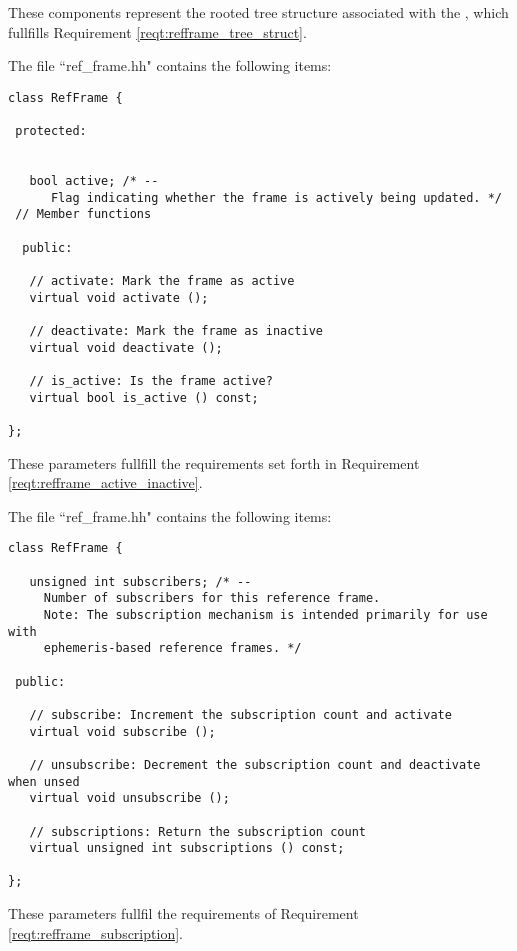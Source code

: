 These components represent the rooted tree structure associated with the
, which fullfills Requirement \ref{reqt:refframe_tree_struct}.

\label{inspect:refframe_active_inactive}

The file ``ref\_frame.hh" contains the following items:

\begin{verbatim}
class RefFrame {

 protected:


   bool active; /* --
      Flag indicating whether the frame is actively being updated. */
 // Member functions

  public:

   // activate: Mark the frame as active
   virtual void activate ();

   // deactivate: Mark the frame as inactive
   virtual void deactivate ();

   // is_active: Is the frame active?
   virtual bool is_active () const;

};
\end{verbatim}

These parameters fullfill the requirements set forth in Requirement
\ref{reqt:refframe_active_inactive}.

\label{inspect:refframe_subscribe}

The file ``ref\_frame.hh" contains the following items:

\begin{verbatim}
class RefFrame {

   unsigned int subscribers; /* --
     Number of subscribers for this reference frame.
     Note: The subscription mechanism is intended primarily for use with
     ephemeris-based reference frames. */

 public:

   // subscribe: Increment the subscription count and activate
   virtual void subscribe ();

   // unsubscribe: Decrement the subscription count and deactivate when unsed
   virtual void unsubscribe ();

   // subscriptions: Return the subscription count
   virtual unsigned int subscriptions () const;

};

\end{verbatim}

These parameters fullfil the requirements of Requirement
\ref{reqt:refframe_subscription}.

